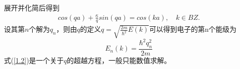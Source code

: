 展开并化简后得到
\begin{equation}
    \begin{aligned}
        cos(qa) + \frac{\kappa}{q}sin(qa) = cos(ka), \quad k\in BZ.
    \end{aligned}
    \label{1.2}
\end{equation}
设其第$n$个解为$q_n$，则由$q$的定义$q = \sqrt{\frac{2m}{\hbar^2}E(k)}$可以得到电子的第n个能级为
\begin{equation}
    E_n(k) = \frac{\hbar^2q_n^2}{2m}
\end{equation}
式(\ref{1.2})是一个关于$q$的超越方程，一般只能数值求解。